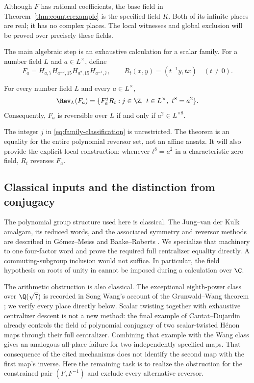 Although $F$ has rational coefficients, the base field in
Theorem~\ref{thm:counterexample} is the specified field $K$.
Both of its infinite places are real; it has no complex places.
The local witnesses and global exclusion will be proved over precisely
these fields.

The main algebraic step is an exhaustive calculation for a scalar
family. For a number field $L$ and $a\in L^\times$, define
\begin{equation}\label{eq:family}
  F_a=H_{a,7}H_{a^{-2},15}H_{a^2,15}H_{a^{-1},7},
  \qquad R_t(x,y)=(t^{-1}y,tx)\quad(t\ne0).
\end{equation}

\begin{theorem}\label{thm:family}
For every number field $L$ and every $a\in L^\times$,
\begin{equation}\label{eq:family-classification}
  \Rev_L(F_a)=
  \{F_a^jR_t:j\in\Z,\ t\in L^\times,\ t^8=a^2\}.
\end{equation}
Consequently, $F_a$ is reversible over $L$ if and only if
$a^2\in L^{\times8}$.
\end{theorem}

The integer $j$ in \eqref{eq:family-classification} is unrestricted.
The theorem is an equality for the entire polynomial reversor set,
not an affine ansatz. It will also provide the explicit local
construction: whenever $t^8=a^2$ in a characteristic-zero field,
$R_t$ reverses $F_a$.

\subsection*{Classical inputs and the distinction from conjugacy}

The polynomial group structure used here is classical.
The Jung--van der Kulk amalgam, its reduced words, and the associated
symmetry and reversor methods are described in
G\'omez--Meiss \cite{gomez2004reversors} and
Baake--Roberts \cite{baake2005symmetries}.
We specialize that machinery to one four-factor word and prove the
required full centralizer equality directly. A commuting-subgroup
inclusion would not suffice. In particular, the field hypothesis on
roots of unity in \cite[Theorem~2 and Corollary~1]{baake2005symmetries}
cannot be imposed during a calculation over $\C$.

The arithmetic obstruction is also classical. The exceptional
eighth-power class over $\Q(\sqrt7)$ is recorded in Song Wang's
account of the Grunwald--Wang theorem
\cite{wang2015grunwald}; we verify every place directly below.
Scalar twisting together with exhaustive centralizer descent is not
a new method: the final example of
Cantat--Dujardin \cite[Section~2.2]{cantat2024holomorphically}
already controls the field of polynomial conjugacy of two
scalar-twisted H\'enon maps through their full centralizer.
Combining that example with the Wang class gives an analogous
all-place failure for two independently specified maps.
That consequence of the cited mechanisms does not identify the
second map with the first map's inverse.
Here the remaining task is to realize the obstruction for the
constrained pair $(F,F^{-1})$ and exclude every alternative reversor.

